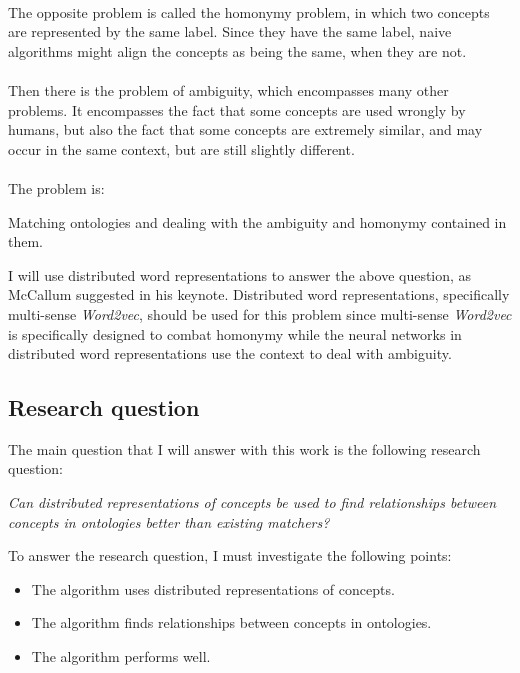 \documentclass{article}
\begin{document}
 \paragraph{}
 The opposite problem is called the homonymy problem, in which two concepts are represented by the same label. Since they have the same label, naive algorithms might align the concepts as being the same, when they are not.
 \paragraph{}
 Then there is the problem of ambiguity, which encompasses many other problems. It encompasses the fact that some concepts are used wrongly by humans, but also the fact that some concepts are extremely similar, and may occur in the same context, but are still slightly different.
 \paragraph{}
 The problem is:
 
 {\centering
  Matching ontologies and dealing with the ambiguity and homonymy contained in them.
 }

  I will use distributed word representations to answer the above question, as McCallum suggested in his keynote. Distributed word representations, specifically multi-sense \emph{Word2vec}, should be used for this problem since multi-sense \emph{Word2vec} is specifically designed to combat homonymy while the neural networks in distributed word representations use the context to deal with ambiguity.
  
 \subsection{Research question} \label{researchquestion}
 The main question that I will answer with this work is the following research question:
 
 \begin{center}
 \textit{
 Can distributed representations of concepts be used to find relationships between concepts in ontologies better than existing matchers?
 }
 \end{center}
 
 To answer the research question, I must investigate the following points:
 \begin{itemize}
 \item The algorithm uses distributed representations of concepts.
 \item The algorithm finds relationships between concepts in ontologies.
 \item The algorithm performs well.
 \end{itemize}
 
\end{document}
